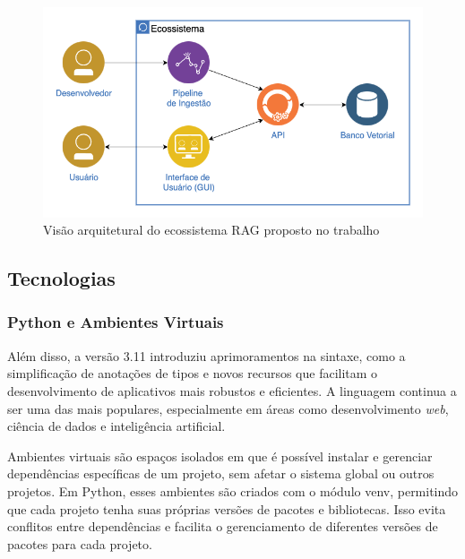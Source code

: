 \documentclass[a4paper, 12pt]{article}
\begin{document}
    \begin{figure}[ht]
        \includegraphics[width=\textwidth,height=0.9\textheight,keepaspectratio]{ecosystem.png}
        \centering
        \caption{Visão arquitetural do ecossistema RAG proposto no trabalho}
        \centering
        \label{fig:ecosystem}
    \end{figure}

    \clearpage

    \subsection{Tecnologias} \label{sec:technologies}

    \subsubsection{Python e Ambientes Virtuais} \label{sec:python}
    
    
    Além disso, a versão 3.11 introduziu aprimoramentos na sintaxe, como a simplificação de anotações de tipos e novos recursos que facilitam o desenvolvimento de aplicativos mais robustos e eficientes. A linguagem continua a ser uma das mais populares, especialmente em áreas como desenvolvimento \textit{web}, ciência de dados e inteligência artificial.
    
    Ambientes virtuais são espaços isolados em que é possível instalar e gerenciar dependências específicas de um projeto, sem afetar o sistema global ou outros projetos. Em Python, esses ambientes são criados com o módulo venv, permitindo que cada projeto tenha suas próprias versões de pacotes e bibliotecas. Isso evita conflitos entre dependências e facilita o gerenciamento de diferentes versões de pacotes para cada projeto.
\end{document}
